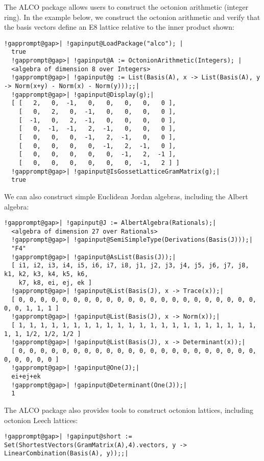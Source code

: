 \documentclass[a4paper,11pt]{report}
\begin{document}
{ The \textsf{ALCO} package allows users to construct the octonion arithmetic (integer ring). In
the example below, we construct the octonion arithmetic and verify that the
basis vectors define an E8 lattice relative to the inner product shown: 
\begin{Verbatim}[commandchars=!@|,fontsize=\small,frame=single,label=Example]
  !gapprompt@gap>| !gapinput@LoadPackage("alco"); |
  true 
  !gapprompt@gap>| !gapinput@A := OctonionArithmetic(Integers); |
  <algebra of dimension 8 over Integers>
  !gapprompt@gap>| !gapinput@g := List(Basis(A), x -> List(Basis(A), y -> Norm(x+y) - Norm(x) - Norm(y)));;|
  !gapprompt@gap>| !gapinput@Display(g);|
  [ [   2,   0,  -1,   0,   0,   0,   0,   0 ],
    [   0,   2,   0,  -1,   0,   0,   0,   0 ],
    [  -1,   0,   2,  -1,   0,   0,   0,   0 ],
    [   0,  -1,  -1,   2,  -1,   0,   0,   0 ],
    [   0,   0,   0,  -1,   2,  -1,   0,   0 ],
    [   0,   0,   0,   0,  -1,   2,  -1,   0 ],
    [   0,   0,   0,   0,   0,  -1,   2,  -1 ],
    [   0,   0,   0,   0,   0,   0,  -1,   2 ] ]
  !gapprompt@gap>| !gapinput@IsGossetLatticeGramMatrix(g);|
  true
\end{Verbatim}
 We can also construct simple Euclidean Jordan algebras, including the Albert
algebra: 
\begin{Verbatim}[commandchars=!@|,fontsize=\small,frame=single,label=Example]
  !gapprompt@gap>| !gapinput@J := AlbertAlgebra(Rationals);|
  <algebra of dimension 27 over Rationals>
  !gapprompt@gap>| !gapinput@SemiSimpleType(Derivations(Basis(J)));|
  "F4"
  !gapprompt@gap>| !gapinput@AsList(Basis(J));|
  [ i1, i2, i3, i4, i5, i6, i7, i8, j1, j2, j3, j4, j5, j6, j7, j8, k1, k2, k3, k4, k5, k6,
    k7, k8, ei, ej, ek ]
  !gapprompt@gap>| !gapinput@List(Basis(J), x -> Trace(x));|
  [ 0, 0, 0, 0, 0, 0, 0, 0, 0, 0, 0, 0, 0, 0, 0, 0, 0, 0, 0, 0, 0, 0, 0, 0, 1, 1, 1 ]
  !gapprompt@gap>| !gapinput@List(Basis(J), x -> Norm(x));|
  [ 1, 1, 1, 1, 1, 1, 1, 1, 1, 1, 1, 1, 1, 1, 1, 1, 1, 1, 1, 1, 1, 1, 1, 1, 1/2, 1/2, 1/2 ]
  !gapprompt@gap>| !gapinput@List(Basis(J), x -> Determinant(x));|
  [ 0, 0, 0, 0, 0, 0, 0, 0, 0, 0, 0, 0, 0, 0, 0, 0, 0, 0, 0, 0, 0, 0, 0, 0, 0, 0, 0 ]
  !gapprompt@gap>| !gapinput@One(J);|
  ei+ej+ek
  !gapprompt@gap>| !gapinput@Determinant(One(J));|
  1
\end{Verbatim}
 The \textsf{ALCO} package also provides tools to construct octonion lattices, including octonion
Leech lattices: 
\begin{Verbatim}[commandchars=!@|,fontsize=\small,frame=single,label=Example]
  !gapprompt@gap>| !gapinput@short := Set(ShortestVectors(GramMatrix(A),4).vectors, y -> LinearCombination(Basis(A), y));;|

\end{Verbatim}}
\end{document}
